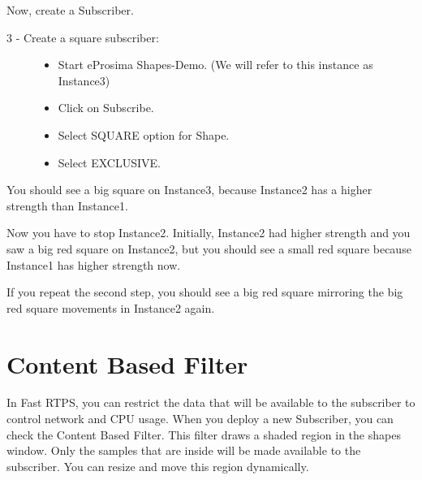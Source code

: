 \documentclass[letterpaper,10pt,english]{sphinxmanual}
\begin{document}

Now, create a Subscriber.
\begin{description}
\item[{3 - Create a square subscriber:}] \leavevmode\begin{itemize}
\item {} 
Start eProsima Shapes-Demo. (We will refer to this instance as Instance3)

\item {} 
Click on Subscribe.

\item {} 
Select SQUARE option for Shape.

\item {} 
Select EXCLUSIVE.

\end{itemize}

\end{description}

You should see a big square on Instance3, because Instance2 has a higher strength than Instance1.



Now you have to stop Instance2. Initially, Instance2 had higher strength and you saw a big red square on Instance2, but you should see a small red square because Instance1 has higher strength now.


If you repeat the second step, you should see a big red square mirroring the big red square movements in Instance2 again.


\chapter{Content Based Filter}
\label{\detokenize{content_based_filter:content-based-filter}}\label{\detokenize{content_based_filter::doc}}
In Fast RTPS, you can restrict the data that will be available to the subscriber to control network and CPU usage. When you deploy a new Subscriber, you can check the Content Based Filter. This filter draws a shaded region in the shapes window. Only the samples that are inside will be made available to the subscriber. You can resize and move this region dynamically.
\end{document}
